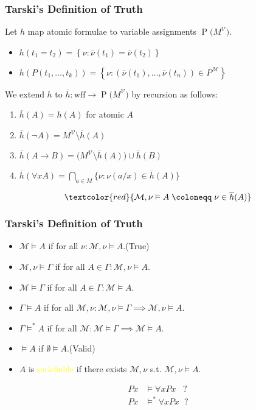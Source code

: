 \documentclass[UTF8,11pt,colorlinks,compress,openany]{beamer}%
\begin{document}
\begin{frame}\frametitle{Tarski's Definition of Truth}
	Let $h$ map atomic formulae to variable assignments $\operatorname{P}\big(M^{\mathcal{V}}\big)$.
	\begin{itemize}
		\item $h(t_1=t_2)=\left\{\nu:\overline{\nu}(t_1)=\overline{\nu}(t_2)\right\}$
		\item $h(P(t_1,\dots,t_k))=\left\{\nu:(\overline{\nu}(t_1),\dots,\overline{\nu}(t_n))\in P^{\mathcal{M}}\right\}$
	\end{itemize}
	We extend $h$ to $\overline{h}:\mathrm{wff}\to \operatorname{P}\big(M^{\mathcal{V}}\big)$ by recursion as follows:\\
	\vspace{2ex}
	\begin{block}{}
		\begin{enumerate}
			\item $\overline{h}(A)=h(A)$ for atomic $A$
			\item $\overline{h}(\neg A)=M^{\mathcal{V}}\setminus\overline{h}(A)$
			\item $\overline{h}(A\to B)=\big(M^{\mathcal{V}}\setminus\overline{h}(A)\big)\cup\overline{h}(B)$
			\item $\overline{h}(\forall x A)=\bigcap\limits_{a\in M}\big\{\nu: \nu(a/x)\in\overline{h}(A)\big\}$
		\end{enumerate}
	\end{block}
	\[\textcolor{red}{\mathcal{M},\nu\vDash A \;\coloneqq \;\nu\in\overline{h}(A)}\]
\end{frame}

\begin{frame}\frametitle{Tarski's Definition of Truth}
		\begin{block}{}
			\begin{itemize}
				\item $\mathcal{M}\vDash A$ if for all $\nu:\mathcal{M},\nu\vDash A$.\hfill (True)
				\item $\mathcal{M},\nu\vDash\Gamma$ if for all $A\in\Gamma: \mathcal{M},\nu\vDash A$.
				\item $\mathcal{M}\vDash\Gamma$ if for all $A\in\Gamma:\mathcal{M}\vDash A$.
				\item $\Gamma\vDash A$ if for all $\mathcal{M},\nu: \mathcal{M},\nu\vDash\Gamma\implies\mathcal{M},\nu\vDash A$.
				\item $\Gamma\vDash^* A$ if for all $\mathcal{M}:\mathcal{M}\vDash\Gamma\implies\mathcal{M}\vDash A$.
				\item $\vDash A$ if $\emptyset\vDash A$.\hfill (Valid)
				\item $A$ is \textcolor{yellow}{satisfiable} if there exists $\mathcal{M},\nu$ s.t. $\mathcal{M},\nu\vDash A$.
			\end{itemize}
		\end{block}
\begin{align*}
Px&\vDash\forall xPx\;\;\;?\\
Px&\vDash^*\forall xPx\;\;?
\end{align*}
\end{frame}
\end{document}
